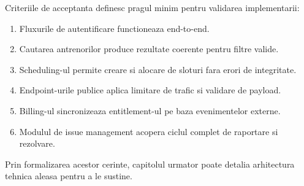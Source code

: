 Criteriile de acceptanta definesc pragul minim pentru validarea implementarii:
\begin{enumerate}[leftmargin=1.2cm]
    \item Fluxurile de autentificare functioneaza end-to-end.
    \item Cautarea antrenorilor produce rezultate coerente pentru filtre valide.
    \item Scheduling-ul permite creare si alocare de sloturi fara erori de integritate.
    \item Endpoint-urile publice aplica limitare de trafic si validare de payload.
    \item Billing-ul sincronizeaza entitlement-ul pe baza evenimentelor externe.
    \item Modulul de issue management acopera ciclul complet de raportare si rezolvare.
\end{enumerate}

Prin formalizarea acestor cerinte, capitolul urmator poate detalia arhitectura tehnica aleasa pentru a le sustine.

